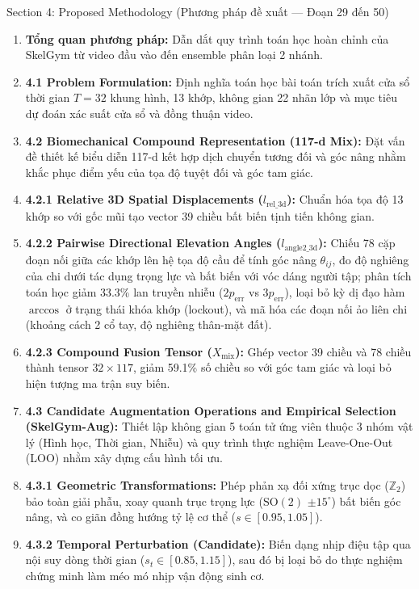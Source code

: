 \documentclass[10pt,a4paper]{article}
\begin{document}
\begin{secbox}{Section 4: Proposed Methodology (Phương pháp đề xuất — Đoạn 29 đến 50)}
\begin{enumerate}[leftmargin=*, itemsep=2pt, topsep=1pt, start=29]
    \item \textbf{Tổng quan phương pháp:} Dẫn dắt quy trình toán học hoàn chỉnh của SkelGym từ video đầu vào đến ensemble phân loại 2 nhánh.
    \item \textbf{4.1 Problem Formulation:} Định nghĩa toán học bài toán trích xuất cửa sổ thời gian $T=32$ khung hình, 13 khớp, không gian 22 nhãn lớp và mục tiêu dự đoán xác suất cửa sổ và đồng thuận video.
    \item \textbf{4.2 Biomechanical Compound Representation (117-d Mix):} Đặt vấn đề thiết kế biểu diễn 117-d kết hợp dịch chuyển tương đối và góc nâng nhằm khắc phục điểm yếu của tọa độ tuyệt đối và góc tam giác.
    \item \textbf{4.2.1 Relative 3D Spatial Displacements ($l_{\text{rel\_3d}}$):} Chuẩn hóa tọa độ 13 khớp so với gốc mũi tạo vector 39 chiều bất biến tịnh tiến không gian.
    \item \textbf{4.2.2 Pairwise Directional Elevation Angles ($l_{\text{angle2\_3d}}$):} Chiếu 78 cặp đoạn nối giữa các khớp lên hệ tọa độ cầu để tính góc nâng $\theta_{ij}$, đo độ nghiêng của chi dưới tác dụng trọng lực và bất biến với vóc dáng người tập; phân tích toán học giảm 33.3\% lan truyền nhiễu ($2p_{\text{err}}$ vs $3p_{\text{err}}$), loại bỏ kỳ dị đạo hàm $\arccos$ ở trạng thái khóa khớp (lockout), và mã hóa các đoạn nối ảo liên chi (khoảng cách 2 cổ tay, độ nghiêng thân-mặt đất).
    \item \textbf{4.2.3 Compound Fusion Tensor ($X_{\text{mix}}$):} Ghép vector 39 chiều và 78 chiều thành tensor $32 \times 117$, giảm 59.1\% số chiều so với góc tam giác và loại bỏ hiện tượng ma trận suy biến.
    \item \textbf{4.3 Candidate Augmentation Operations and Empirical Selection (SkelGym-Aug):} Thiết lập không gian 5 toán tử ứng viên thuộc 3 nhóm vật lý (Hình học, Thời gian, Nhiễu) và quy trình thực nghiệm Leave-One-Out (LOO) nhằm xây dựng cấu hình tối ưu.
    \item \textbf{4.3.1 Geometric Transformations:} Phép phản xạ đối xứng trục dọc ($\mathbb{Z}_2$) bảo toàn giải phẫu, xoay quanh trục trọng lực ($\mathrm{SO}(2)$ $\pm 15^\circ$) bất biến góc nâng, và co giãn đồng hướng tỷ lệ cơ thể ($s \in [0.95, 1.05]$).
    \item \textbf{4.3.2 Temporal Perturbation (Candidate):} Biến dạng nhịp điệu tập qua nội suy dòng thời gian ($s_t \in [0.85, 1.15]$), sau đó bị loại bỏ do thực nghiệm chứng minh làm méo mó nhịp vận động sinh cơ.

\end{enumerate}
\end{secbox}
\end{document}
